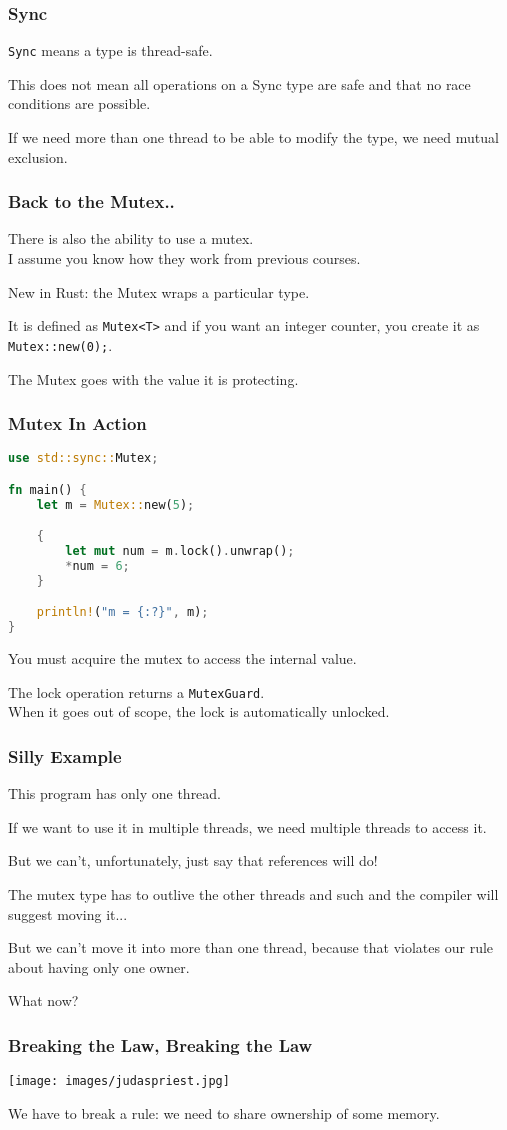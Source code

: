 \begin{frame}
\frametitle{Sync}

\texttt{Sync} means a type is thread-safe.


This does not mean all operations on a Sync type are safe and that no race conditions are possible.

If we need more than one thread to be able to modify the type, we need mutual exclusion.
\end{frame}


\begin{frame}
\frametitle{Back to the Mutex..}
There is also the ability to use a mutex.\\
\quad I assume you know how they work from previous courses.

New in Rust: the Mutex wraps a particular type.

It is defined as \texttt{Mutex<T>} and if you want an integer counter, you create it as \texttt{Mutex::new(0);}.


The Mutex goes with the value it is protecting.
\end{frame}


\begin{frame}[fragile]
\frametitle{Mutex In Action}

\begin{lstlisting}[language=Rust]
use std::sync::Mutex;

fn main() {
    let m = Mutex::new(5);

    {
        let mut num = m.lock().unwrap();
        *num = 6;
    }

    println!("m = {:?}", m);
}
\end{lstlisting}

You must acquire the mutex to access the internal value.

The lock operation returns a \texttt{MutexGuard}.\\
\quad When it goes out of scope, the lock is automatically unlocked.


\end{frame}


\begin{frame}
\frametitle{Silly Example}
This program has only one thread.

If we want to use it in multiple threads, we need multiple threads to access it. 

But we can't, unfortunately, just say that references will do! 

The mutex type has to outlive the other threads and such and the compiler will suggest moving it... 

But we can't move it into more than one thread, because that violates our rule about having only one owner. 

What now?



\end{frame}

\begin{frame}
\frametitle{Breaking the Law, Breaking the Law}

\begin{center}
	\texttt{[image: images/judaspriest.jpg]}
\end{center}

We have to break a rule: we need to share ownership of some memory. 

\end{frame}




